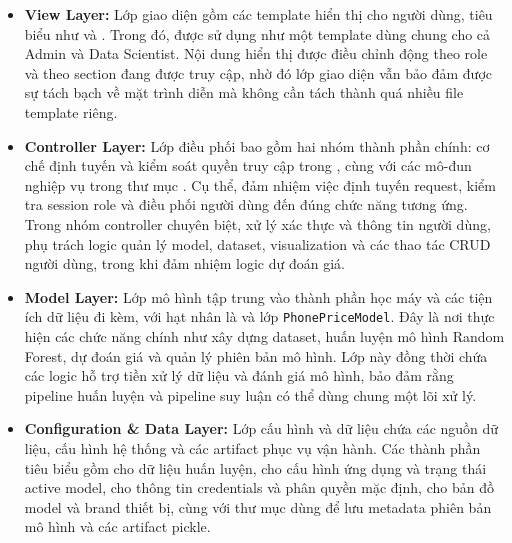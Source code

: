 \begin{itemize}
    \item \textbf{View Layer:} Lớp giao diện gồm các template hiển thị cho người dùng, tiêu biểu như  và . Trong đó,  được sử dụng như một template dùng chung cho cả Admin và Data Scientist. Nội dung hiển thị được điều chỉnh động theo role và theo section đang được truy cập, nhờ đó lớp giao diện vẫn bảo đảm được sự tách bạch về mặt trình diễn mà không cần tách thành quá nhiều file template riêng.

    \item \textbf{Controller Layer:} Lớp điều phối bao gồm hai nhóm thành phần chính: cơ chế định tuyến và kiểm soát quyền truy cập trong , cùng với các mô-đun nghiệp vụ trong thư mục . Cụ thể,  đảm nhiệm việc định tuyến request, kiểm tra session role và điều phối người dùng đến đúng chức năng tương ứng. Trong nhóm controller chuyên biệt,  xử lý xác thực và thông tin người dùng,  phụ trách logic quản lý model, dataset, visualization và các thao tác CRUD người dùng, trong khi  đảm nhiệm logic dự đoán giá.

    \item \textbf{Model Layer:} Lớp mô hình tập trung vào thành phần học máy và các tiện ích dữ liệu đi kèm, với hạt nhân là  và lớp \texttt{PhonePriceModel}. Đây là nơi thực hiện các chức năng chính như xây dựng dataset, huấn luyện mô hình Random Forest, dự đoán giá và quản lý phiên bản mô hình. Lớp này đồng thời chứa các logic hỗ trợ tiền xử lý dữ liệu và đánh giá mô hình, bảo đảm rằng pipeline huấn luyện và pipeline suy luận có thể dùng chung một lõi xử lý.

    \item \textbf{Configuration \& Data Layer:} Lớp cấu hình và dữ liệu chứa các nguồn dữ liệu, cấu hình hệ thống và các artifact phục vụ vận hành. Các thành phần tiêu biểu gồm  cho dữ liệu huấn luyện,  cho cấu hình ứng dụng và trạng thái active model,  cho thông tin credentials và phân quyền mặc định,  cho bản đồ model và brand thiết bị, cùng với thư mục  dùng để lưu metadata phiên bản mô hình và các artifact pickle.
\end{itemize}

